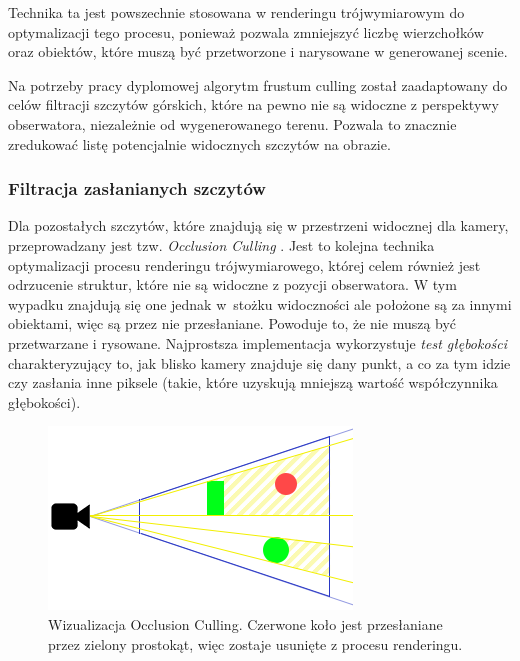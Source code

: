 \par

Technika ta jest powszechnie stosowana w renderingu trójwymiarowym do optymalizacji tego procesu, ponieważ pozwala zmniejszyć liczbę wierzchołków oraz obiektów, które muszą być przetworzone i narysowane w generowanej scenie.

Na potrzeby pracy dyplomowej algorytm frustum culling został zaadaptowany do celów filtracji szczytów górskich, które na pewno nie są widoczne z perspektywy obserwatora, niezależnie od wygenerowanego terenu. Pozwala to znacznie zredukować listę potencjalnie widocznych szczytów na obrazie. 


\subsubsection{Filtracja zasłanianych szczytów} \label{sec:occlusion}

Dla pozostałych szczytów, które znajdują się w przestrzeni widocznej dla kamery, przeprowadzany jest tzw. \textit{Occlusion Culling} \cite{occlusion_culling}. Jest to kolejna technika optymalizacji procesu renderingu trójwymiarowego, której celem również jest odrzucenie struktur, które nie są widoczne z pozycji obserwatora. W tym wypadku znajdują się one jednak w~stożku widoczności ale położone są za innymi obiektami, więc są przez nie przesłaniane. Powoduje to, że nie muszą być przetwarzane i rysowane. Najprostsza implementacja wykorzystuje \textit{test głębokości} charakteryzujący to, jak blisko kamery znajduje się dany punkt, a co za tym idzie czy zasłania inne piksele (takie, które uzyskują mniejszą wartość współczynnika głębokości). 

\begin{figure}[!h]
    \centering \includegraphics[width=0.80\linewidth]{img/occlusion_culling.png}
    \caption{Wizualizacja Occlusion Culling. Czerwone koło jest przesłaniane przez zielony prostokąt, więc zostaje usunięte z procesu renderingu.}
    \label{fig:occlusion-culling}
\end{figure}

